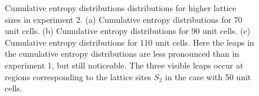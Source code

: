 \documentclass[fleqn,10pt]{wlscirep}
\begin{document}
\begin{figure}
\centering
{}
\caption{Cumulative entropy distributions distributions for higher lattice sizes in experiment 2. (a) Cumulative entropy distributions for 70 unit cells. (b) Cumulative entropy distributions for 90 unit cells. (c) Cumulative entropy distributions for 110 unit cells. Here the leaps in the cumulative entropy distributions are less pronounced than in experiment 1, but still noticeable. The three visible leaps occur at regions corresponding to the lattice sites $S_2$ in the case with 50 unit cells.}
\label{cdf2}
\end{figure}
\end{document}
